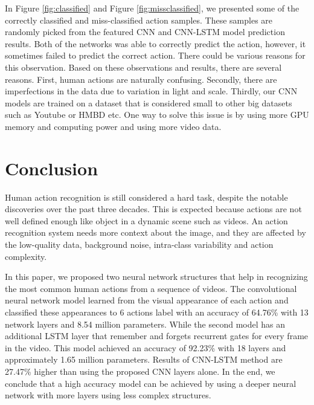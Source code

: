 \documentclass{vldb}
\begin{document}
In Figure \ref{fig:classified} and Figure \ref{fig:missclassified}, we presented some of the correctly classified and miss-classified action samples. These samples are randomly picked from the featured CNN and CNN-LSTM model prediction results. Both of the networks was able to correctly predict the action, however, it sometimes failed to predict the correct action.
There could be various reasons for this observation. Based on these observations and results, there are several reasons. First, human actions are naturally confusing. Secondly, there are imperfections in the data due to variation in light and scale. Thirdly, our CNN models are trained on a dataset that is considered small to other big datasets such as Youtube or HMBD etc. One way to solve this issue is by using more GPU memory and computing power and using more video data.

\balance

\section{Conclusion}
Human action recognition is still considered a hard task, despite the notable discoveries over the past three decades. This is expected because actions are not well defined enough like object in a dynamic scene such as videos. An action recognition system needs more context about the image, and they are affected by the low-quality data, background noise, intra-class variability and action complexity.

In this paper, we proposed two neural network structures that help in recognizing the most common human actions from a sequence of videos. The convolutional neural network model learned from the visual appearance of each action and classified these appearances to 6 actions label with an accuracy of 64.76\% with 13 network layers and 8.54 million parameters. While the second model has an additional LSTM layer that remember and forgets recurrent gates for every frame in the video. This model achieved an accuracy of 92.23\% with 18 layers and approximately 1.65 million parameters. Results of CNN-LSTM method are 27.47\% higher than using the proposed CNN layers alone. In the end, we conclude that a high accuracy model can be achieved by using a deeper neural network with more layers using less complex structures.






\end{document}
